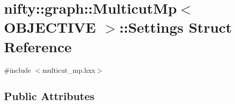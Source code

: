 \hypertarget{structnifty_1_1graph_1_1MulticutMp_1_1Settings}{}\section{nifty\+:\+:graph\+:\+:Multicut\+Mp$<$ O\+B\+J\+E\+C\+T\+I\+V\+E $>$\+:\+:Settings Struct Reference}
\label{structnifty_1_1graph_1_1MulticutMp_1_1Settings}


{\ttfamily \#include $<$multicut\+\_\+mp.\+hxx$>$}

\subsection*{Public Attributes}
